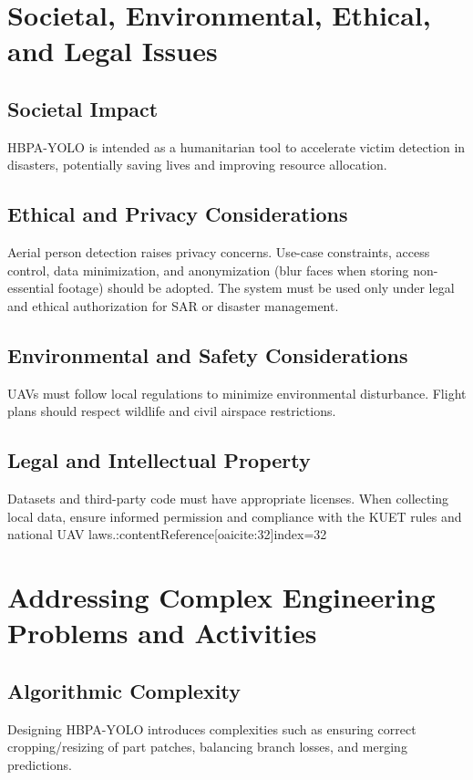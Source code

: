 \documentclass[12pt,a4paper]{report}
\begin{document}
\chapter{Societal, Environmental, Ethical, and Legal Issues}

\section{Societal Impact}
HBPA-YOLO is intended as a humanitarian tool to accelerate victim detection in disasters, potentially saving lives and improving resource allocation.

\section{Ethical and Privacy Considerations}
Aerial person detection raises privacy concerns. Use-case constraints, access control, data minimization, and anonymization (blur faces when storing non-essential footage) should be adopted. The system must be used only under legal and ethical authorization for SAR or disaster management.

\section{Environmental and Safety Considerations}
UAVs must follow local regulations to minimize environmental disturbance. Flight plans should respect wildlife and civil airspace restrictions.

\section{Legal and Intellectual Property}
Datasets and third-party code must have appropriate licenses. When collecting local data, ensure informed permission and compliance with the KUET rules and national UAV laws.:contentReference[oaicite:32]{index=32}


\chapter{Addressing Complex Engineering Problems and Activities}

\section{Algorithmic Complexity}
Designing HBPA-YOLO introduces complexities such as ensuring correct cropping/resizing of part patches, balancing branch losses, and merging predictions.
\end{document}
